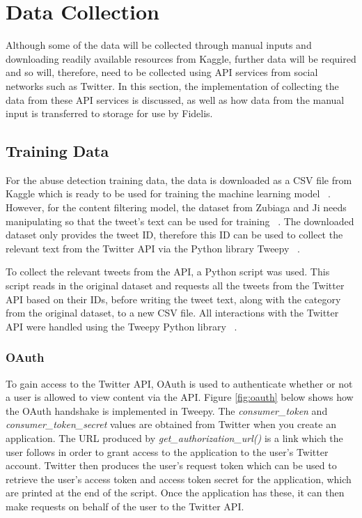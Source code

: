 \section{Data Collection}
Although some of the data will be collected through manual inputs and downloading readily available resources from Kaggle, further data will be required and so will, therefore, need to be collected using API services from social networks such as Twitter. In this section, the implementation of collecting the data from these API services is discussed, as well as how data from the manual input is transferred to storage for use by Fidelis.

\subsection{Training Data} \label{sec:training-data}
For the abuse detection training data, the data is downloaded as a CSV file from Kaggle which is ready to be used for training the machine learning model ~\cite{Kaggle:Dataset}. However, for the content filtering model, the dataset from Zubiaga and Ji needs manipulating so that the tweet's text can be used for training ~\cite{Zubiaga:Tweets}. The downloaded dataset only provides the tweet ID, therefore this ID can be used to collect the relevant text from the Twitter API via the Python library Tweepy ~\cite{Tweepy}.

To collect the relevant tweets from the API, a Python script was used. This script reads in the original dataset and requests all the tweets from the Twitter API based on their IDs, before writing the tweet text, along with the category from the original dataset, to a new CSV file. All interactions with the Twitter API were handled using the Tweepy Python library ~\cite{Tweepy}. 

\subsubsection{OAuth}
To gain access to the Twitter API, OAuth is used to authenticate whether or not a user is allowed to view content via the API. Figure \ref{fig:oauth} below shows how the OAuth handshake is implemented in Tweepy. The \textit{consumer\_token} and \textit{consumer\_token\_secret} values are obtained from Twitter when you create an application. The URL produced by \textit{get\_authorization\_url()} is a link which the user follows in order to grant access to the application to the user's Twitter account. Twitter then produces the user's request token which can be used to retrieve the user's access token and access token secret for the application, which are printed at the end of the script. Once the application has these, it can then make requests on behalf of the user to the Twitter API.

